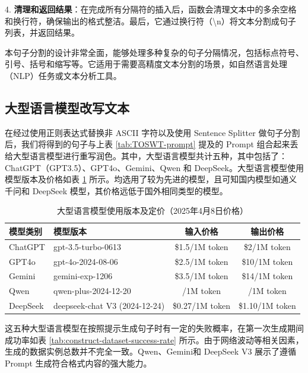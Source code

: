 4. \textbf{清理和返回结果}：在完成所有分隔符的插入后，函数会清理文本中的多余空格和换行符，确保输出的格式整洁。最后，它通过换行符（\textbackslash{}n）将文本分割成句子列表，并返回结果。

本句子分割的设计非常全面，能够处理多种复杂的句子分隔情况，包括标点符号、引号、括号和缩写等。它适用于需要高精度文本分割的场景，如自然语言处理（NLP）任务或文本分析工具。

\subsection{大型语言模型改写文本}
\label{sec:TOSWT-gen-llm}

在经过使用正则表达式替换非 ASCII 字符以及使用 Sentence Splitter 做句子分割后，我们将得到的句子与上表 \ref{tab:TOSWT-prompt} 提及的 Prompt 组合起来丢给大型语言模型进行重写润色。其中，大型语言模型共计五种，其中包括了：ChatGPT（GPT3.5）、GPT4o、Gemini、Qwen 和 DeepSeek。大型语言模型使用模型版本及价格如表 \ref{tab:TOSWT-llmcost} 所示。均选用了较为先进的模型，且可知国内模型如通义千问和 DeepSeek 模型，其价格远低于国外相同类型的模型。

\begin{table}[htbp]
\centering
\caption{大型语言模型使用版本及定价（2025年4月8日价格）} \label{tab:TOSWT-llmcost}
\begin{tabular}{llcc}
\toprule
\textbf{模型类别} & \textbf{模型版本}                 & \textbf{输入价格}  & \textbf{输出价格}  \\ \midrule
ChatGPT       & gpt-3.5-turbo-0613            & \$1.5/1M token  & \$2/1M token    \\
GPT4o         & gpt-4o-2024-08-06             & \$2.5/1M token  & \$10/1M token   \\
Gemini        & gemini-exp-1206               & \$3.5/1M token  & \$14/1M token   \\
Qwen          & qwen-plus-2024-12-20          & \textyen 0.8/1M token  & \textyen 2/1M token    \\
DeepSeek      & deepseek-chat V3 (2024-12-24) & \$0.27/1M token & \$1.10/1M token \\ \bottomrule
\end{tabular}
\end{table}

这五种大型语言模型在按照提示生成句子时有一定的失败概率，在第一次生成期间成功率如表 \ref {tab:construct-dataset-success-rate} 所示。由于网络波动等相关因素，生成的数据实例总数并不完全一致。Qwen、Gemini和 DeepSeek V3 展示了遵循 Prompt 生成符合格式内容的强大能力。

